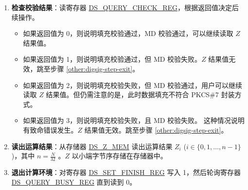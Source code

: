 \documentclass[main\_\_CN.tex]{subfiles}
\begin{document}
\begin{enumerate}
    \item {\bfseries 检查校验结果}：读寄存器 \hyperref[regdesc:DSQUERYCHECKREG]{DS\_QUERY\_CHECK\_REG}，根据返回值决定后续操作。

    \begin{itemize}

        \item 如果返回值为 0，则说明填充校验通过，MD 校验通过，可以继续读取 \begin{math}Z\end{math} 结果值。

        \item 如果返回值为 1，则说明填充校验通过，但 MD 校验失败。\begin{math}Z\end{math} 结果值无效，跳至步骤 \ref{other:digsig-step-exit}。

        \item 如果返回值为 2，则说明填充校验失败，但 MD 校验通过，用户可以继续读取 \begin{math}Z\end{math} 结果值。但仍需注意的是，此时数据填充不符合 PKCS\#7 封装方式。

        \item 如果返回值为 3，则说明填充校验失败，且 MD 校验失败。 这种情况说明有致命错误发生。\begin{math}Z\end{math} 结果值无效。跳至步骤 \ref{other:digsig-step-exit}。

    \end{itemize}

    \item {\bfseries 读出运算结果}：从存储器 \hyperref[DSZMEM]{DS\_Z\_MEM} 读出运算结果 \begin{math}Z_{i}\end{math} (\begin{math}i \in \{0,1, \dots,n-1\}\end{math})，其中 \begin{math} n = \frac{N}{32} \end{math} 。\begin{math}Z\end{math} 以小端字节序存储在存储器中。

    \item {\bfseries 退出计算环境\label{other:digsig-step-exit}}：对寄存器 \hyperref[regdesc:DSSETFINISHREG]{DS\_SET\_FINISH\_REG} 写入 1，然后轮询寄存器 \hyperref[regdesc:DSQUERYBUSYREG]{DS\_QUERY\_BUSY\_REG} 直到读到 0。

\end{enumerate}
\end{document}
